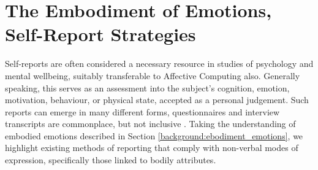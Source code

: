 





\section{The Embodiment of Emotions, Self-Report Strategies}

Self-reports are often considered a necessary resource in studies of psychology and mental wellbeing, suitably transferable to Affective Computing also. Generally speaking, this serves as an assessment into the subject's cognition, emotion, motivation, behaviour, or physical state, accepted as a personal judgement. Such reports can emerge in many different forms, questionnaires and interview transcripts are commonplace, but not inclusive \cite{barker_self-report_2016}. Taking the understanding of embodied emotions described in Section \ref{background:ebodiment_emotions}, we highlight existing methods of reporting that comply with non-verbal modes of expression, specifically those linked to bodily attributes.

